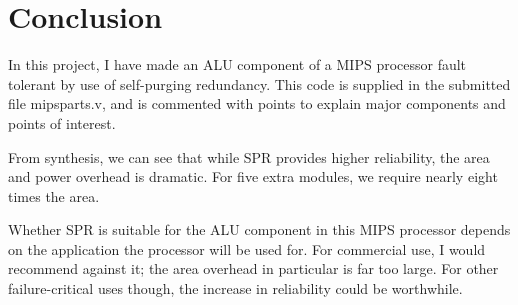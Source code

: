\documentclass[a4paper,12pt]{article}
\begin{document}
    \section{Conclusion}
    In this project, I have made an ALU component of a MIPS processor fault tolerant by use of self-purging redundancy. This code is supplied in the submitted file mipsparts.v, and is commented with points to explain major components and points of interest.

    From synthesis, we can see that while SPR provides higher reliability, the area and power overhead is dramatic. For five extra modules, we require nearly eight times the area.

    Whether SPR is suitable for the ALU component in this MIPS processor depends on the application the processor will be used for. For commercial use, I would recommend against it; the area overhead in particular is far too large. For other failure-critical uses though, the increase in reliability could be worthwhile.

    \printbibliography
\end{document}
